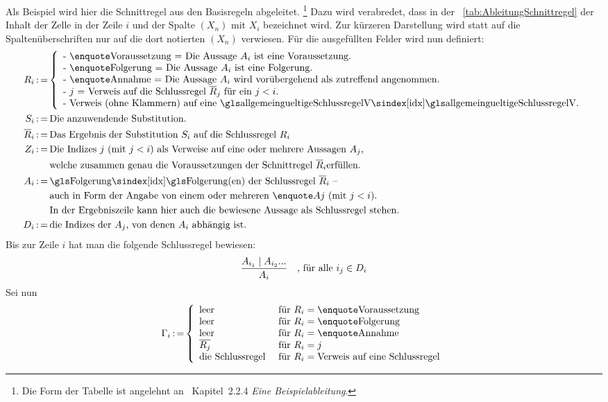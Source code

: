 Als Beispiel wird hier die Schnittregel aus den Basisregeln abgeleitet.%
\footnote{%
	Die Form der Tabelle ist angelehnt an~\cite{bib:NatuerlichesSchliessen} Kapitel~2.2.4 \emph{Eine Beispielableitung}.%
}
Dazu wird verabredet, dass in der \tablename~\vref{tab:AbleitungSchnittregel} der Inhalt der Zelle in der Zeile $i$ und der Spalte $(X_n)$ mit $X_i$ bezeichnet wird.
Zur kürzeren Darstellung wird statt auf die Spaltenüberschriften nur auf die dort notierten $(X_n)$ verwiesen.
Für die ausgefüllten Felder wird nun definiert:
\begin{align}
	R_i & \defeq
	\left\{
		\begin{array}{l}
			\text{- \strqt{Voraussetzung} = Die Aussage $A_i$ ist eine Voraussetzung.}\\
			\text{- \strqt{Folgerung} = Die Aussage $A_i$ ist eine Folgerung.}\\
			\text{- \strqt{Annahme} = Die Aussage $A_i$ wird vorübergehend als zutreffend angenommen.}\\
			\text{- $j$ = Verweis auf die Schlussregel $\overline{R}_j$ für ein $j < i$.}\\
			\text{- Verweis (ohne Klammern) auf eine \glsIdx{allgemeingueltigeSchlussregelV}.}
		\end{array}
	\right.
	\\
	S_i & \defeq \text{Die anzuwendende Substitution.}
	\\
	\overline{R}_i & \defeq \text{Das Ergebnis der Substitution $S_i$ auf die Schlussregel $R_i$}
	\\
	Z_i & \defeq \text{Die Indizes $j$ (mit $j < i$) als Verweise auf eine oder mehrere Aussagen $A_j$,}\\
	& \quad\;\; \text{welche zusammen genau die Voraussetzungen der Schnittregel } \overline{R}_i \text{erfüllen.}
	\\
	A_i & \defeq \text{\glsIdx{Folgerung}(en) der Schlussregel $\overline{R}_i$ --}\\
	& \quad\;\; \text{auch in Form der Angabe von einem oder mehreren \strqt{$Aj$} (mit $j < i$).}\\
	& \quad\;\; \text{In der Ergebniszeile kann hier auch die bewiesene Aussage als Schlussregel stehen.}
	\\
	D_i & \defeq \text{die Indizes der $A_j$, von denen $A_i$ abhängig ist.}
\end{align}
Bis zur Zeile $i$ hat man die folgende Schlussregel bewiesen:
\[ \frac{A_{i_1} \mid A_{i_2} ...}{A_i} \quad \text{, für alle } i_j \in D_i \]
Sei nun
\[
	\Gamma_i \defeq
	\left\{
		\begin{array}{ll}
			\text{leer}    & \text{ für } R_i = \text{\strqt{Voraussetzung}} \\
			\text{leer}    & \text{ für } R_i = \text{\strqt{Folgerung}}     \\
			\text{leer}    & \text{ für } R_i = \text{\strqt{Annahme}}       \\
			\overline{R_j} & \text{ für } R_i = j                            \\
			\text{die Schlussregel} & \text{ für } R_i = \text{Verweis auf eine Schlussregel}
		\end{array}
	\right.
\]
